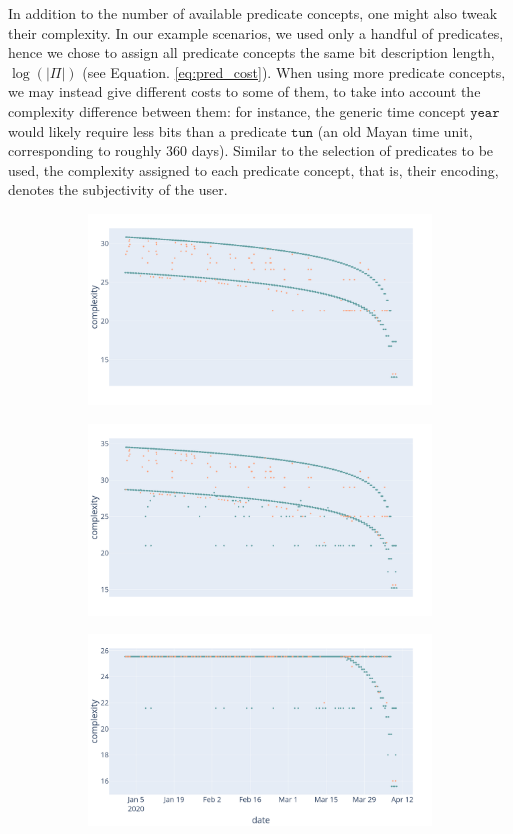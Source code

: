 \documentclass[entropy,article,submit,moreauthors,pdftex]{Definitions/mdpi}
\begin{document}
In addition to the number of available predicate concepts, one might also tweak their complexity. In our example scenarios, we used only a handful of predicates, hence we chose to assign all predicate concepts the same bit description length, $\log(|\Pi|)$ (see Equation. \ref{eq:pred_cost}). When using more predicate concepts, we may instead give different costs to some of them, to take into account the complexity difference between them: for instance, the generic time concept $\texttt{year}$ would likely require less bits than a predicate $\texttt{tun}$ (an old Mayan time unit, corresponding to roughly 360 days). Similar to the selection of predicates to be used, the complexity assigned to each predicate concept, that is, their encoding, denotes the subjectivity of the user.
\newpage

\begin{figure}[H]
    \centering
    \begin{subfigure}{\linewidth}
        \centering
        \includegraphics[width=.7\linewidth]{figures/preds_1.png}
        \caption{}
        \label{fig:pred_1}
    \end{subfigure}
    \begin{subfigure}{\linewidth}
        \centering
        \includegraphics[width=.7\linewidth]{figures/preds_2.png}
        \caption{}
        \label{fig:pred_2}
    \end{subfigure}
    \begin{subfigure}{\linewidth}
        \centering
        \includegraphics[width=.7\linewidth]{figures/preds_3.png}

\end{subfigure}
\end{figure}
\end{document}
